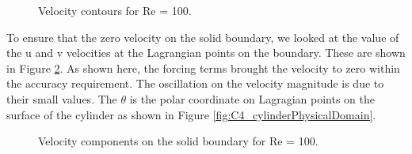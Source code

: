 \begin{figure}[H]
    \centering
    \quad
    \caption{Velocity contours for Re = 100.}
    \label{fig:C4_contourPlotsForFlowOverCylidnerGE}
\end{figure}

To ensure that the zero velocity on the solid boundary, we looked at the value of the u and v velocities at the Lagrangian points on the boundary. These are shown in Figure \ref{fig:C4_fluidVelocityOnCylinder}. As shown here, the forcing terms brought the velocity to zero within the accuracy requirement. The oscillation on the velocity magnitude is due to their small values. The $\theta$ is the polar coordinate on Lagragian points on the surface of the cylinder as shown in Figure \ref{fig:C4_cylinderPhysicalDomain}.

\begin{figure}[H]
    \centering
    \quad
    \caption{Velocity components on the solid boundary for Re = 100.}
    \label{fig:C4_fluidVelocityOnCylinder}
\end{figure}

